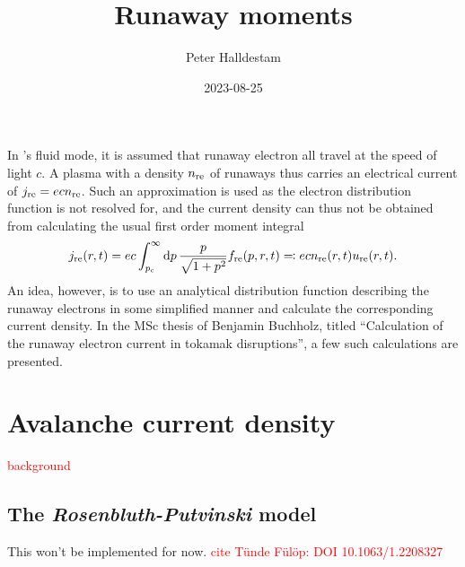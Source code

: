 \documentclass{notes}
\title{Runaway moments}
\author{Peter Halldestam}
\date{2023-08-25}
\newcommand{\jre}{j_{\rm re}}
\newcommand{\nre}{n_{\rm re}}
\newcommand{\fre}{f_{\rm re}}
\newcommand{\ure}{u_{\rm re}}
\newcommand{\pc}{p_{\rm c}}
\newcommand{\Zeff}{Z_{\rm eff}}
\newcommand{\lnL}{\ln\Lambda}
\newcommand{\E}{E_\parallel}
\newcommand{\trel}{\tau_{\rm r}}
\newcommand{\me}{m_{\rm e}}
\renewcommand{\ne}{n_{\rm e}}
\begin{document}
	\maketitle

	\noindent
	In \DREAM's fluid mode, it is assumed that runaway electron all travel at the speed of light $c$.
	A plasma with a density $\nre$ of runaways thus carries an electrical current of $\jre=ec\nre$.
	Such an approximation is used as the electron distribution function is not resolved for, and the current density can thus not be obtained from calculating the usual first order moment integral
	\begin{equation}
		\label{eq:first-moment}
		\jre(r, t)=ec\int_{\pc}^\infty\dd{p}\frac{p}{\sqrt{1+p^2}}\fre(p, r, t)\eqqcolon ec\nre(r, t)\ure(r, t).
	\end{equation}
	An idea, however, is to use an analytical distribution function describing the runaway electrons in some simplified manner and calculate the corresponding current density.
	In the MSc thesis of Benjamin Buchholz, titled ``Calculation of the runaway electron current in tokamak disruptions'', a few such calculations are presented.

	\section{Avalanche current density}
	\textcolor{red}{background}

	\subsection{The \textit{Rosenbluth-Putvinski} model}
	This won't be implemented for now.
	\textcolor{red}{cite Tünde Fülöp: DOI 10.1063/1.2208327}

\end{document}
